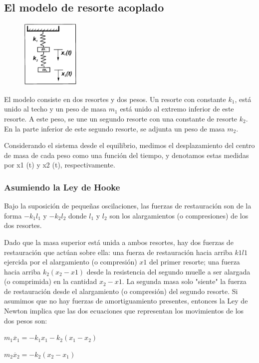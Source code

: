 \documentclass{article}
\begin{document}
\subsection{El modelo de resorte acoplado}
\begin{figure}
  \centering
  \includegraphics[width=0.25\textwidth]{SistemaResortes.PNG}
\end{figure}
El modelo consiste en dos resortes y dos pesos. Un resorte con constante $k_{1}$, está unido al techo y un peso de masa $m_{1}$ está unido al extremo inferior de este resorte. A este peso, se une un segundo resorte con una constante de resorte $k_{2}$. En la parte inferior de este segundo resorte, se adjunta un peso de masa $m_{2}$.

Considerando el sistema desde el equilibrio, medimos el desplazamiento del centro de masa de cada peso como una función del tiempo, y denotamos estas medidas por x1 (t) y x2 (t), respectivamente.

\subsubsection{Asumiendo la Ley de Hooke}
Bajo la suposición de pequeñas oscilaciones, las fuerzas de restauración son de la forma $-k_{1}l_{1}$ y $-k_{2}l_{2}$ donde $l_{1}$ y $l_{2}$ son los alargamientos (o compresiones) de los dos resortes.

Dado que la masa superior está unida a ambos resortes, hay dos fuerzas de restauración que actúan sobre ella: una fuerza de restauración hacia arriba $k1l1$ ejercida por el alargamiento (o compresión) $x1$ del primer resorte; una fuerza hacia arriba $k_{2}(x_{2}-x1)$ desde la resistencia del segundo muelle a ser alargada (o comprimida) en la cantidad $x_{2}-x1$. La segunda masa solo "siente" la fuerza de restauración desde el alargamiento (o compresión) del segundo resorte. Si asumimos que no hay fuerzas de amortiguamiento presentes, entonces la Ley de Newton implica que las dos ecuaciones que representan los movimientos de los dos pesos son:

\begin{center}
$m_{1}\ddot{x_{1}}=-k_{1}x_{1}-k_{2}(x_{1}-x_{2})$
\end{center}
\begin{center}
$m_{2}\ddot{x_{2}}=-k_{2}(x_{2}-x_{1})$
\end{center}
\end{document}
